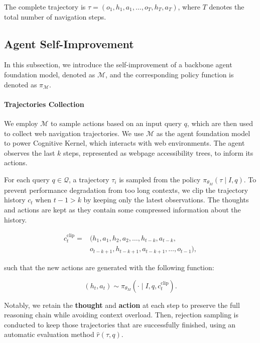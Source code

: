 \documentclass[11pt]{article}
\begin{document}
The complete trajectory is $\tau = (o_1, h_1, a_1, \dots, o_T, h_T, a_T)$, where $T$ denotes the total number of navigation steps.

\subsection{Agent Self-Improvement}

In this subsection, we introduce the self-improvement of a backbone agent foundation model, denoted as $\mathcal{M}$, and the corresponding policy function is denoted as $\pi_{\mathcal{M}}$.

\paragraph{Trajectories Collection}
We employ $\mathcal{M}$ to sample actions based on an input query $q$, 
which are then used to collect web navigation trajectories. 
We use $\mathcal{M}$ as the agent foundation model to power Cognitive Kernel, which interacts with web environments. 
The agent observes the last $k$ steps, represented as webpage accessibility trees, to inform its actions.

For each query $q \in \mathcal{Q}$, a trajectory $\tau_i$ is sampled from the policy $\pi_{\theta_M}(\tau \mid I, q)$. 
To prevent performance degradation from too long contexts, we clip the trajectory history $c_t$ when $t - 1 > k$ by keeping only the latest observations. The thoughts and actions are kept as they contain some compressed information about the history.

\begin{align} \label{equation:c-clip}
    c_t^{\text{clip}} =& (h_1, a_1, h_2, a_2, \dots, h_{t-k}, a_{t-k},  \nonumber \\
    & o_{t-k+1}, h_{t-k+1}, a_{t-k+1}, \dots, o_{t-1}),
\end{align}

such that the new actions are generated with the following function:

\begin{equation} \label{equation:gpt-4o-reasoning}
    (h_t, a_t) \sim \pi_{\theta_M}(\cdot \mid I, q, c_t^{\text{clip}}).
\end{equation}

Notably, we retain the \textbf{thought} and \textbf{action} at each step to preserve the full reasoning chain while avoiding context overload.
Then, rejection sampling is conducted to keep those trajectories that are successfully finished, using an automatic evaluation method $\hat{r}(\tau, q)$. 
\end{document}
